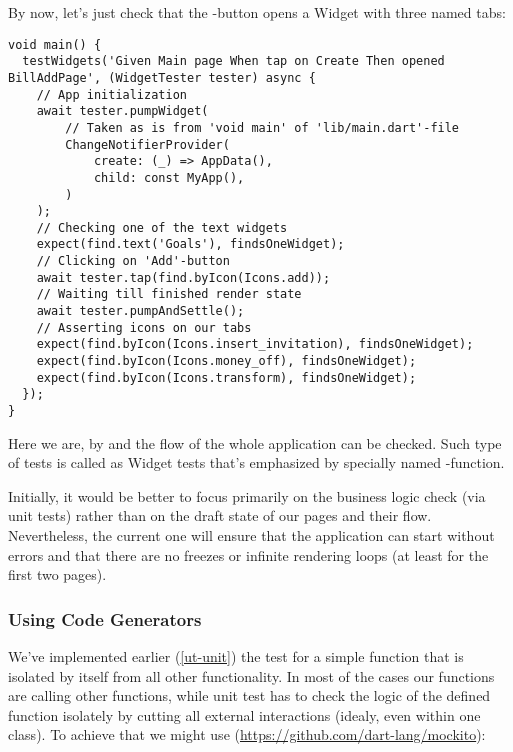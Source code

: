 \noindent By now, let's just check that the -button opens a Widget with three named tabs:

\begin{lstlisting}
void main() {
  testWidgets('Given Main page When tap on Create Then opened BillAddPage', (WidgetTester tester) async {
    // App initialization
    await tester.pumpWidget(
        // Taken as is from 'void main' of 'lib/main.dart'-file
        ChangeNotifierProvider(
            create: (_) => AppData(),
            child: const MyApp(),
        )
    );
    // Checking one of the text widgets
    expect(find.text('Goals'), findsOneWidget);
    // Clicking on 'Add'-button
    await tester.tap(find.byIcon(Icons.add));
    // Waiting till finished render state
    await tester.pumpAndSettle();
    // Asserting icons on our tabs
    expect(find.byIcon(Icons.insert_invitation), findsOneWidget);
    expect(find.byIcon(Icons.money_off), findsOneWidget);
    expect(find.byIcon(Icons.transform), findsOneWidget);
  });
}
\end{lstlisting}

\noindent Here we are, by  and  the flow of the whole application can be checked. Such type of tests 
is called as Widget tests that's emphasized by specially named -function.

Initially, it would be better to focus primarily on the business logic check (via unit tests) rather than on the draft 
state of our pages and their flow. Nevertheless, the current one will ensure that the application can start without 
errors and that there are no freezes or infinite rendering loops (at least for the first two pages). 


\subsubsection{Using Code Generators} \label{ut-code-generator}

We've implemented earlier (\ref{ut-unit}) the test for a simple function that is isolated by itself from all other 
functionality. In most of the cases our functions are calling other functions, while unit test has to check the logic 
of the defined function isolately by cutting all external interactions (idealy, even within one class). To achieve that 
we might use  (\href{https://github.com/dart-lang/mockito}{https://github.com/dart-lang/mockito}):


